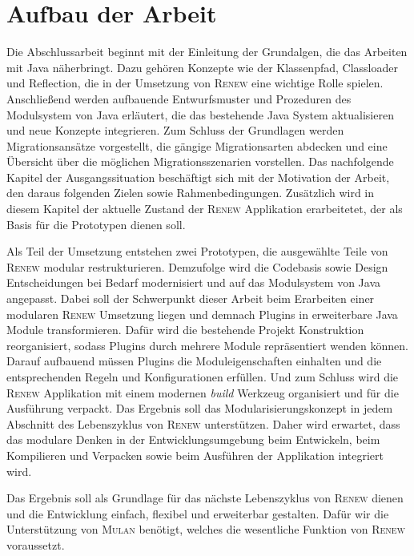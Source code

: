 \section{Aufbau der Arbeit} \label{sec:AdA}
	Die Abschlussarbeit beginnt mit der Einleitung der Grundalgen, die das Arbeiten mit Java näherbringt. Dazu gehören Konzepte wie der Klassenpfad, Classloader und Reflection, die in der Umsetzung von \textsc{Renew} eine wichtige Rolle spielen. Anschließend werden aufbauende Entwurfsmuster und Prozeduren des Modulsystem von Java erläutert, die das bestehende Java System aktualisieren und neue Konzepte integrieren. Zum Schluss der Grundlagen werden Migrationsansätze vorgestellt, die gängige Migrationsarten abdecken und eine Übersicht über die möglichen Migrationsszenarien vorstellen.\newline 
	Das nachfolgende Kapitel der Ausgangssituation beschäftigt sich mit der Motivation der Arbeit, den daraus folgenden Zielen sowie Rahmenbedingungen. Zusätzlich wird in diesem Kapitel der aktuelle Zustand der \textsc{Renew} Applikation erarbeitetet, der als Basis für die Prototypen dienen soll. \bigbreak 

	Als Teil der Umsetzung entstehen zwei Prototypen, die ausgewählte Teile von \textsc{Renew} modular restrukturieren. Demzufolge wird die Codebasis sowie Design Entscheidungen bei Bedarf modernisiert und auf das Modulsystem von Java angepasst. Dabei soll der Schwerpunkt dieser Arbeit beim Erarbeiten einer modularen \textsc{Renew} Umsetzung liegen und demnach Plugins in erweiterbare Java Module transformieren.\newline
	Dafür wird die bestehende Projekt Konstruktion reorganisiert, sodass Plugins durch mehrere Module repräsentiert wenden können. Darauf aufbauend müssen Plugins die Moduleigenschaften einhalten und die entsprechenden Regeln und Konfigurationen erfüllen. Und zum Schluss wird die \textsc{Renew} Applikation mit einem modernen \textit{build} Werkzeug organisiert und für die Ausführung verpackt.\newline
	Das Ergebnis soll das Modularisierungskonzept in jedem Abschnitt des Lebenszyklus von \textsc{Renew} unterstützen. Daher wird erwartet, dass das modulare Denken in der Entwicklungsumgebung beim Entwickeln, beim Kompilieren und Verpacken sowie beim Ausführen der Applikation integriert wird. \bigbreak

	Das Ergebnis soll als Grundlage für das nächste Lebenszyklus von \textsc{Renew} dienen und die Entwicklung einfach, flexibel und erweiterbar gestalten. Dafür wir die Unterstützung von \textsc{Mulan} benötigt, welches die wesentliche Funktion von \textsc{Renew} voraussetzt. 
